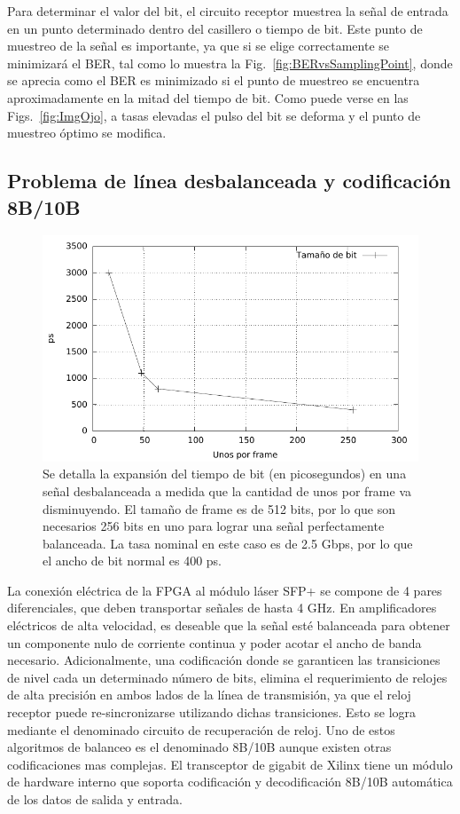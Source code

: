 Para determinar el valor del bit, el circuito receptor muestrea la señal de entrada en un punto determinado dentro del casillero o tiempo de bit. Este punto de muestreo de la señal es importante, ya que si se elige correctamente se minimizará el BER, tal como lo muestra la Fig.~\ref{fig:BERvsSamplingPoint}, donde se aprecia como el BER es minimizado si el punto de muestreo se encuentra aproximadamente en la mitad del tiempo de bit. 
Como puede verse en las Figs.~\ref{fig:ImgOjo}, a tasas elevadas el pulso del bit se deforma y el punto de muestreo óptimo se modifica.


\subsection{Problema de línea desbalanceada y codificación 8B/10B}
\label{problemacodificacion}
\begin{figure}[t]
  \centering
    \includegraphics[width=5in]{graphs/expansionbit.pdf}
\caption {Se detalla la expansión del tiempo de bit (en picosegundos) en una señal desbalanceada a medida que la cantidad de unos por frame va disminuyendo. El tamaño de frame es de 512 bits, por lo que son necesarios 256 bits en uno para lograr una señal perfectamente balanceada. La tasa nominal en este caso es de 2.5 Gbps, por lo que el ancho de bit normal es 400 ps.}
\label{fig:expansionbit}
\end{figure}

\label{problema8b10b}
La conexión eléctrica de la FPGA al módulo láser SFP+ se compone de 4 pares diferenciales, que deben transportar señales de hasta 4 GHz. En amplificadores eléctricos de alta velocidad, es deseable que la señal esté balanceada para obtener un componente nulo de corriente continua y poder acotar el ancho de banda necesario. Adicionalmente, una codificación donde se garanticen las transiciones de nivel cada un determinado número de bits, elimina el requerimiento de relojes de alta precisión en ambos lados de la línea de transmisión, ya que el reloj receptor puede re-sincronizarse utilizando dichas transiciones. Esto se logra mediante el denominado circuito de recuperación de reloj.
Uno de estos algoritmos de balanceo es el denominado 8B/10B aunque existen otras codificaciones mas complejas. El transceptor de gigabit de Xilinx tiene un módulo de hardware interno que soporta codificación y decodificación 8B/10B automática de los datos de salida y entrada.

